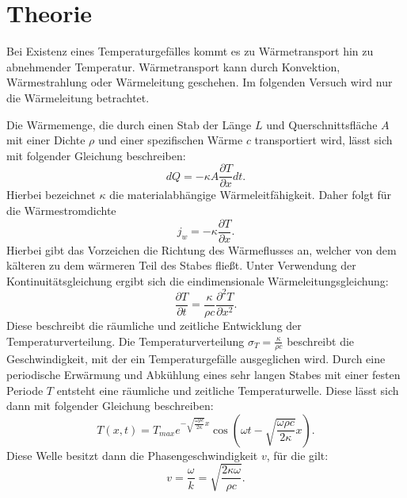 \section{Theorie}
\label{sec:theorie}
Bei Existenz eines Temperaturgefälles kommt es zu Wärmetransport hin zu
abnehmender Temperatur. Wärmetransport kann durch Konvektion, Wärmestrahlung oder
Wärmeleitung geschehen. Im folgenden Versuch wird nur die Wärmeleitung betrachtet.

Die Wärmemenge, die durch einen Stab der Länge $L$ und Querschnittsfläche $A$
mit einer Dichte $\rho$ und einer spezifischen Wärme $c$ transportiert wird,
lässt sich mit folgender Gleichung beschreiben:
\begin{equation}
  dQ = - \kappa A \frac{\partial T}{\partial x} dt.
  \label{eqn:wärmemenge}
\end{equation}
Hierbei bezeichnet $\kappa$ die materialabhängige Wärmeleitfähigkeit.
Daher folgt für die Wärmestromdichte
\begin{equation}
  j_w = - \kappa \frac{\partial T}{\partial x}.
  \label{eqn:wärmestromdichte}
\end{equation}
Hierbei gibt das Vorzeichen die Richtung des Wärmeflusses an, welcher von dem kälteren
zu dem wärmeren Teil des Stabes fließt.
Unter Verwendung der Kontinuitätsgleichung ergibt sich die eindimensionale
Wärmeleitungsgleichung:
\begin{equation}
  \frac{\partial T}{\partial t} = \frac{\kappa}{\rho c} \frac{\partial^2 T}{\partial x^2}.
  \label{eqn:wärmeleitungsgleichung}
\end{equation}
Diese beschreibt die räumliche und zeitliche Entwicklung der Temperaturverteilung.
Die Temperaturverteilung $\sigma_T = \frac{\kappa}{\rho c}$ beschreibt die
Geschwindigkeit, mit der ein Temperaturgefälle ausgeglichen wird.
Durch eine periodische Erwärmung und Abkühlung eines sehr langen Stabes mit einer
festen Periode $T$ entsteht eine räumliche und zeitliche Temperaturwelle.
Diese lässt sich dann mit folgender Gleichung beschreiben:
\begin{equation}
  T(x,t) = T_{max} e^{-\sqrt{\frac{\omega \rho c}{2 \kappa}} x} \cos{\left(\omega t - \sqrt{\frac{\omega \rho c}{2 \kappa}} x \right)}.
  \label{eqn:temperaturwelle}
\end{equation}
Diese Welle besitzt dann die Phasengeschwindigkeit $v$, für die gilt:
\begin{equation}
  v = \frac{\omega}{k} = \sqrt{\frac{2 \kappa \omega}{\rho c}}.
  \label{eqn:phasengeschwindigkeit}
\end{equation}
